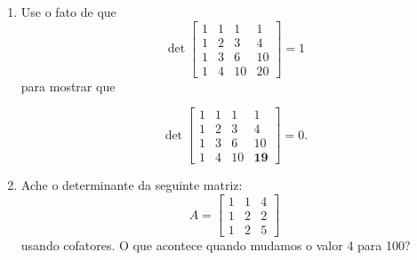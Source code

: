 \documentclass[leqno]{article}
\numberwithin{equation}{section}
\begin{document}
\begin{enumerate}
\begin{sol}
\end{sol}


\item Use o fato de que
$$\det \begin{bmatrix} 1 & 1 & 1 & 1 \\ 1 & 2 & 3 & 4 \\ 1 & 3 & 6 & 10 \\ 1 & 4 & 10 & 20  \end{bmatrix} = 1$$
para mostrar que

$$\det \begin{bmatrix} 1 & 1 & 1 & 1 \\ 1 & 2 & 3 & 4 \\ 1 & 3 & 6 & 10 \\ 1 & 4 & 10 & \mathbf{19}  \end{bmatrix} = 0.$$

\begin{sol}

    
\end{sol}


\item Ache o determinante da seguinte matriz:
$$A = \begin{bmatrix} 1 & 1 & 4 \\ 1 & 2 & 2 \\ 1 & 2 & 5   \end{bmatrix}$$
usando cofatores. O que acontece quando mudamos o valor 4 para 100?

\begin{sol}

    
\end{sol}

\end{enumerate}
\end{document}
